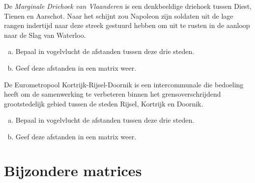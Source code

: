 \documentclass[12pt,twoside]{article}
\begin{document}
\begin{oefening}
De {\em Marginale Driehoek van Vlaanderen} is een denkbeeldige driehoek tussen Diest, Tienen en Aarschot. Naar het schijnt zou Napoleon zijn soldaten uit de lage rangen indertijd naar deze streek gestuurd hebben om uit te rusten in de aanloop naar de Slag van Waterloo.
\begin{enumerate}[(a)]
  \item Bepaal in vogelvlucht de afstanden tussen deze drie steden.
  \item Geef deze afstanden in een matrix weer.
\end{enumerate}
\end{oefening}

\begin{oefening}
De Eurometropool Kortrijk-Rijsel-Doornik is een intercommunale die bedoeling heeft om de samenwerking te verbeteren binnen het grensoverschrijdend grootstedelijk gebied tussen de steden Rijsel, Kortrijk en Doornik.
\begin{enumerate}[(a)]
  \item Bepaal in vogelvlucht de afstanden tussen deze drie steden.
  \item Geef deze afstanden in een matrix weer.
\end{enumerate}
\end{oefening}


\pagebreak

\section{Bijzondere matrices}
\end{document}
